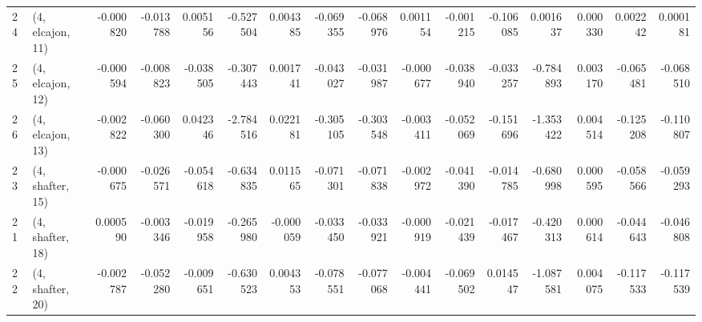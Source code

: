 \begin{tabular}{llrrrrrrrrrrrrrr}
24 &  (4, elcajon, 11) &  -0.000820 & -0.013788 &  0.005156 &  -0.527504 &  0.004385 &  -0.069355 & -0.068976 &  0.001154 & -0.001215 & -0.106085 &   0.001637 &  0.000330 &  0.002242 &  0.000181 \\
25 &  (4, elcajon, 12) &  -0.000594 & -0.008823 & -0.038505 &  -0.307443 &  0.001741 &  -0.043027 & -0.031987 & -0.000677 & -0.038940 & -0.033257 &  -0.784893 &  0.003170 & -0.065481 & -0.068510 \\
26 &  (4, elcajon, 13) &  -0.002822 & -0.060300 &  0.042346 &  -2.784516 &  0.022181 &  -0.305105 & -0.303548 & -0.003411 & -0.052069 & -0.151696 &  -1.353422 &  0.004514 & -0.125208 & -0.110807 \\
23 &  (4, shafter, 15) &  -0.000675 & -0.026571 & -0.054618 &  -0.634835 &  0.011565 &  -0.071301 & -0.071838 & -0.002972 & -0.041390 & -0.014785 &  -0.680998 &  0.000595 & -0.058566 & -0.059293 \\
21 &  (4, shafter, 18) &   0.000590 & -0.003346 & -0.019958 &  -0.265980 & -0.000059 &  -0.033450 & -0.033921 & -0.000919 & -0.021439 & -0.017467 &  -0.420313 &  0.000614 & -0.044643 & -0.046808 \\
22 &  (4, shafter, 20) &  -0.002787 & -0.052280 & -0.009651 &  -0.630523 &  0.004353 &  -0.078551 & -0.077068 & -0.004441 & -0.069502 &  0.014547 &  -1.087581 &  0.004075 & -0.117533 & -0.117539 \\
\bottomrule
\end{tabular}

